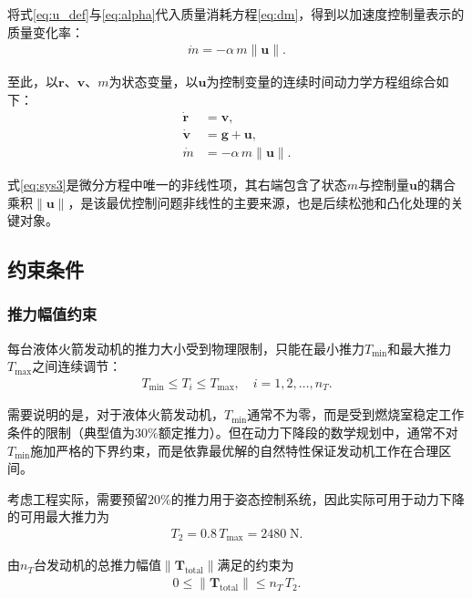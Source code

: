 将式\eqref{eq:u_def}与\eqref{eq:alpha}代入质量消耗方程\eqref{eq:dm}，得到以加速度控制量表示的质量变化率：
\begin{align}
    \dot{m} = -\alpha\,m\|\bm{u}\|. \label{eq:dm_u}
\end{align}

至此，以$\bm{r}$、$\bm{v}$、$m$为状态变量，以$\bm{u}$为控制变量的连续时间动力学方程组综合如下：
\begin{align}
    \dot{\bm{r}} &= \bm{v}, \label{eq:sys1} \\
    \dot{\bm{v}} &= \bm{g} + \bm{u}, \label{eq:sys2} \\
    \dot{m}      &= -\alpha\,m\|\bm{u}\|. \label{eq:sys3}
\end{align}

式\eqref{eq:sys3}是微分方程中唯一的非线性项，其右端包含了状态$m$与控制量$\bm{u}$的耦合乘积$\|\bm{u}\|$，是该最优控制问题非线性的主要来源，也是后续松弛和凸化处理的关键对象。

\subsection{约束条件}

\subsubsection{推力幅值约束}

每台液体火箭发动机的推力大小受到物理限制，只能在最小推力$T_{\min}$和最大推力$T_{\max}$之间连续调节：
\begin{align}
    T_{\min} \leq T_i \leq T_{\max}, \quad i = 1, 2, \ldots, n_T. \label{eq:Ti_bound}
\end{align}

需要说明的是，对于液体火箭发动机，$T_{\min}$通常不为零，而是受到燃烧室稳定工作条件的限制（典型值为$30\%$额定推力）。但在动力下降段的数学规划中，通常不对$T_{\min}$施加严格的下界约束，而是依靠最优解的自然特性保证发动机工作在合理区间。

考虑工程实际，需要预留$20\%$的推力用于姿态控制系统，因此实际可用于动力下降的可用最大推力为
\begin{align}
    T_2 = 0.8\,T_{\max} = 2480\;\mathrm{N}.
\end{align}

由$n_T$台发动机的总推力幅值$\|\bm{T}_{\mathrm{total}}\|$满足的约束为
\begin{align}
    0 \leq \|\bm{T}_{\mathrm{total}}\| \leq n_T\,T_2. \label{eq:T_norm_bound}
\end{align}

